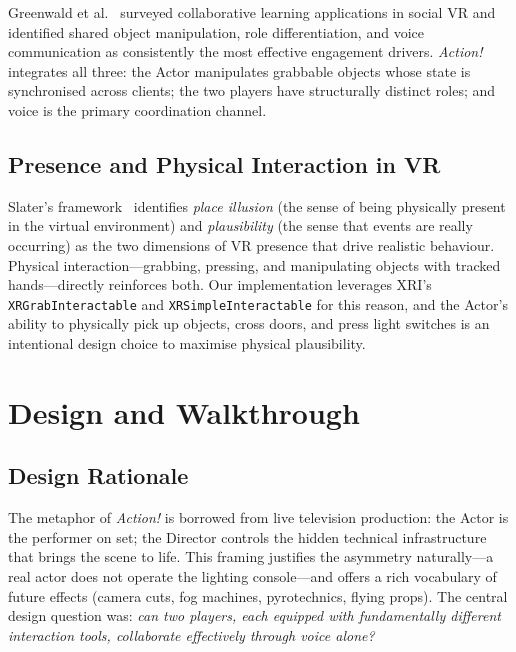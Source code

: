 \documentclass[12pt,a4paper]{article}
\begin{document}
Greenwald et al.~\cite{greenwald2017} surveyed collaborative learning applications in social VR and identified shared object manipulation, role differentiation, and voice communication as consistently the most effective engagement drivers. \textit{Action!} integrates all three: the Actor manipulates grabbable objects whose state is synchronised across clients; the two players have structurally distinct roles; and voice is the primary coordination channel.

\subsection{Presence and Physical Interaction in VR}

Slater's framework~\cite{slater2009} identifies \emph{place illusion} (the sense of being physically present in the virtual environment) and \emph{plausibility} (the sense that events are really occurring) as the two dimensions of VR presence that drive realistic behaviour. Physical interaction---grabbing, pressing, and manipulating objects with tracked hands---directly reinforces both. Our implementation leverages XRI's \texttt{XRGrabInteractable} and \texttt{XRSimpleInteractable} for this reason, and the Actor's ability to physically pick up objects, cross doors, and press light switches is an intentional design choice to maximise physical plausibility.

\section{Design and Walkthrough}
\label{sec:design}

\subsection{Design Rationale}

The metaphor of \textit{Action!} is borrowed from live television production: the Actor is the performer on set; the Director controls the hidden technical infrastructure that brings the scene to life. This framing justifies the asymmetry naturally---a real actor does not operate the lighting console---and offers a rich vocabulary of future effects (camera cuts, fog machines, pyrotechnics, flying props). The central design question was: \emph{can two players, each equipped with fundamentally different interaction tools, collaborate effectively through voice alone?}
\end{document}
